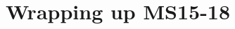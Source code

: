 \documentclass[11pt]{book}
\begin{document}
\clearpage

\section{Wrapping up MS15-18}


\end{document}

